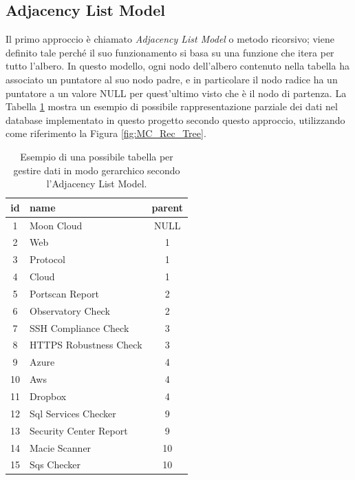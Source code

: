 \subsection{Adjacency List Model}
Il primo approccio è chiamato \textit{Adjacency List Model} o metodo ricorsivo; viene definito tale perché il suo funzionamento si basa su una funzione che 
itera per tutto l'albero.\hfill\break
In questo modello, ogni nodo dell'albero contenuto nella tabella ha associato un puntatore al suo nodo padre, e in particolare il nodo radice ha un puntatore 
a un valore NULL per quest'ultimo visto che è il nodo di partenza.\hfill\break
La Tabella \ref{table:adjacency_list_model_table} mostra un esempio di possibile rappresentazione parziale dei dati nel database implementato in questo progetto 
secondo questo approccio, utilizzando come riferimento la Figura \ref{fig:MC_Rec_Tree}.
%
\begin{table}[ht!]
\centering
\begin{tabular}[c]{| c | l | c |} 
    \hline
    id & name & parent \\ [0.5ex] 
    \hline
    \rowcolor{rootnodecell} 1 & Moon Cloud & NULL \\ [0.5ex] 
    \rowcolor{categorycell} 2 & Web & 1 \\ [0.5ex] 
    \rowcolor{categorycell} 3 & Protocol & 1 \\ [0.5ex] 
    \rowcolor{categorycell} 4 & Cloud & 1 \\ [0.5ex] 
    \rowcolor{evaluationcell} 5 & Portscan Report & 2 \\ [0.5ex] 
    \rowcolor{evaluationcell} 6 & Observatory Check & 2 \\ [0.5ex] 
    \rowcolor{evaluationcell} 7 & SSH Compliance Check & 3 \\ [0.5ex] 
    \rowcolor{evaluationcell} 8 & HTTPS Robustness Check & 3 \\ [0.5ex] 
    \rowcolor{categorycell} 9 & Azure & 4 \\ [0.5ex] 
    \rowcolor{categorycell} 10 & Aws & 4 \\ [0.5ex] 
    \rowcolor{categorycell} 11 & Dropbox & 4 \\ [0.5ex] 
    \rowcolor{evaluationcell} 12 & Sql Services Checker & 9 \\ [0.5ex] 
    \rowcolor{evaluationcell} 13 & Security Center Report & 9 \\ [0.5ex] 
    \rowcolor{evaluationcell} 14 & Macie Scanner & 10 \\ [0.5ex] 
    \rowcolor{evaluationcell} 15 & Sqs Checker & 10 \\ [0.5ex]
    \hline
\end{tabular}
\caption[Gestione di dati secondo l'Adjacency List Model]{Esempio di una possibile tabella per gestire dati in modo gerarchico secondo l'Adjacency List Model.}
\label{table:adjacency_list_model_table}
\end{table}
